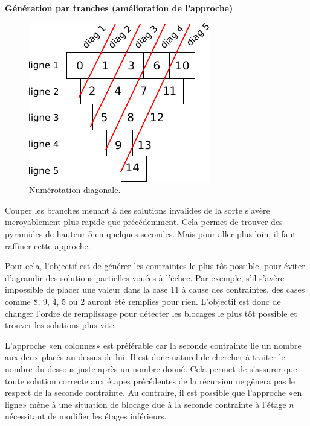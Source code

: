 \documentclass[10pt]{article}\usepackage[correction,nu]{esial}
\begin{document}
\begin{Exercice}\textbf{Génération par tranches (amélioration de l'approche)}
\end{Exercice}

\begin{figure}
  \vspace{-1.6\baselineskip}
  \centerline{\includegraphics[scale=.9]{img/numerotation-diagonales.pdf}}
  \vspace{-.5\baselineskip}
  \caption{Numérotation diagonale.}
  \label{fig:numdiag}
   \vspace{-1.5\baselineskip}
\end{figure}

Couper les branches menant à des solutions invalides de la sorte s'avère
incroyablement plus rapide que précédemment. Cela permet de trouver des
pyramides de hauteur 5 en quelques secondes. Mais pour aller plus loin, il faut
raffiner cette approche.

Pour cela, l'objectif est de générer les contraintes le plus tôt possible, pour
éviter d'agrandir des solutions partielles vouées à l'échec. Par exemple, s'il
s'avère impossible de placer une valeur dans la case 11 à cause des contraintes,
des cases comme 8, 9, 4, 5 ou 2 auront été remplies pour rien. L'objectif est
donc de changer l'ordre de remplissage pour détecter les blocages le plus tôt
possible et trouver les solutions plus vite.

L'approche «en colonnes» est préférable car la seconde contrainte lie un nombre
aux deux placés au dessus de lui. Il est donc naturel de chercher à traiter le
nombre du dessous juste après un nombre donné. Cela permet de s'assurer que
toute solution correcte aux étapes précédentes de la récursion ne gênera pas le
respect de la seconde contrainte. Au contraire, il est possible que l'approche
«en ligne» mène à une situation de blocage due à la seconde contrainte à l'étage
$n$ nécessitant de modifier les étages inférieurs.
\end{document}
